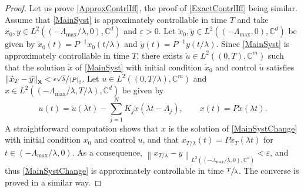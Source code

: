 \documentclass[10pt]{amsart}
\theoremstyle{plain}
\theoremstyle{definition}
\newcommand{\norm}[1]{\left\lVert #1\right\lVert}
\newcommand{\abs}[1]{\left\lvert #1\right \rvert}
\begin{document}
\begin{proof}
Let us prove \eqref{ApproxContrlIff}, the proof of \eqref{ExactContrlIff} being similar. Assume that \eqref{MainSyst} is approximately controllable in time $T$ and take $x_0, y \in L^2((-\Lambda_{\max}/\lambda, 0), \mathbb C^d)$ and $\varepsilon > 0$. Let $\widetilde x_0, \widetilde{y} \in L^2((-\Lambda_{\max}, 0), \mathbb C^d)$ be given by $\widetilde x_0(t) = P^{-1} x_0(t/\lambda)$ and $\widetilde{y}(t) = P^{-1} y(t/\lambda)$. Since \eqref{MainSyst} is approximately controllable in time $T$, there exists $\widetilde u \in L^2((0, T), \mathbb C^m)$ such that the solution $\widetilde x$ of \eqref{MainSyst} with initial condition $\widetilde x_0$ and control $\widetilde u$ satisfies $\norm{\widetilde x_T - \widetilde{y}}_{\mathsf X} < \sfrac{\varepsilon \sqrt{\lambda}}{\abs{P}_{2}}$. Let $u \in L^2((0, T/\lambda), \mathbb C^m)$ and $x \in L^2((-\Lambda_{\max}/\lambda, T/\lambda), \mathbb C^d)$ be given by
\[
u(t) = \widetilde u(\lambda t) - \sum_{j=1}^N K_j \widetilde x(\lambda t - \Lambda_j), \qquad x(t) = P \widetilde x(\lambda t).
\]
A straightforward computation shows that $x$ is the solution of \eqref{MainSystChange} with initial condition $x_0$ and control $u$, and that $x_{T/\lambda}(t) = P \widetilde x_T(\lambda t)$ for $t \in (-\Lambda_{\max}/\lambda, 0)$. As a consequence,
$\norm{x_{T/\lambda} - y}_{L^2((-\Lambda_{\max}/\lambda, 0), \mathbb C^d)}  < \varepsilon$, and thus \eqref{MainSystChange} is approximately controllable in time $\sfrac{T}{\lambda}$. The converse is proved in a similar way.
\end{proof}
\end{document}
